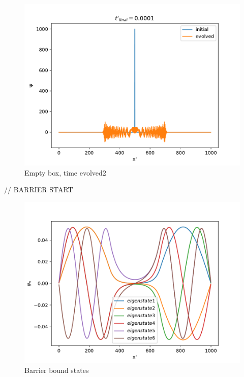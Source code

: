 \documentclass{article}
\begin{document}
\begin{figure}
    \includegraphics[width=\linewidth]{./media/time_evolve_emptybox_2.pdf}
    \caption{Empty box, time evolved2}
    \label{fig:box-time-evolved2}
\end{figure}

// BARRIER START

\begin{figure}
    \includegraphics[width=\linewidth]{./media/bound_eigenstates_barrier.pdf}
    \caption{Barrier bound states}
    \label{fig:barrier-bound-states}
\end{figure}
\end{document}
